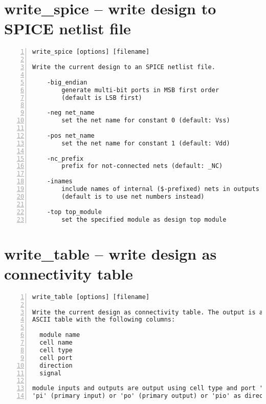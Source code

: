 \section{write\_spice -- write design to SPICE netlist file}
\label{cmd:write_spice}
\begin{lstlisting}[numbers=left,frame=single]
    write_spice [options] [filename]

Write the current design to an SPICE netlist file.

    -big_endian
        generate multi-bit ports in MSB first order
        (default is LSB first)

    -neg net_name
        set the net name for constant 0 (default: Vss)

    -pos net_name
        set the net name for constant 1 (default: Vdd)

    -nc_prefix
        prefix for not-connected nets (default: _NC)

    -inames
        include names of internal ($-prefixed) nets in outputs
        (default is to use net numbers instead)

    -top top_module
        set the specified module as design top module
\end{lstlisting}

\section{write\_table -- write design as connectivity table}
\label{cmd:write_table}
\begin{lstlisting}[numbers=left,frame=single]
    write_table [options] [filename]

Write the current design as connectivity table. The output is a tab-separated
ASCII table with the following columns:

  module name
  cell name
  cell type
  cell port
  direction
  signal

module inputs and outputs are output using cell type and port '-' and with
'pi' (primary input) or 'po' (primary output) or 'pio' as direction.
\end{lstlisting}

